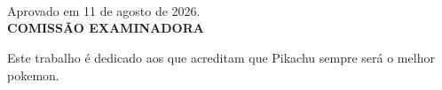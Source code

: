 \documentclass[arial,centeredequations,english,brazilian,oneside,section=TITLE]{ifes8}
\begin{document}
\begin{folhadeaprovacao}
  \begin{center}
    {\ABNTEXchapterfont\MakeTextUppercase{\imprimirautor}}\\
    \begin{center}
      \ABNTEXchapterfont\MakeTextUppercase{\imprimirtitulo}\\
    \end{center}
    \hspace{.45\textwidth}
    \begin{minipage}{.5\textwidth}
      {\footnotesize{\imprimirpreambulo}}\\
    \end{minipage}%
  \end{center}
  \begin{center}
    Aprovado em 11 de agosto de 2026.\\[15mm]
    \textbf{COMISSÃO EXAMINADORA}\\[5mm]
    \makeatletter
    \makeatother
  \end{center}
\end{folhadeaprovacao}

\begin{dedicatoria}
  \vspace*{\fill}
  \hspace{0.2\textwidth}
  \begin{minipage}{0.8\textwidth}
    Este trabalho é dedicado aos que acreditam que Pikachu sempre será o
    melhor pokemon.
  \end{minipage}
\end{dedicatoria}
\end{document}
